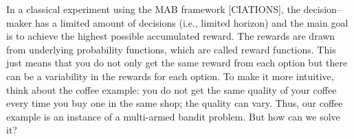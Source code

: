  

In a classical experiment using the MAB framework [CIATIONS], the decision--maker has a limited amount of decisions (i.e., limited horizon) and the main goal is to achieve the highest possible accumulated reward. %
The rewards are drawn from underlying probability functions, which are called reward functions. This just means that you do not only get the same reward from each option but there can be a variability in the rewards for each option. To make it more intuitive, think about the coffee example: you do not get the same quality of your coffee every time you buy one in the same shop; the quality can vary. Thus, our coffee example is an instance of a multi-armed bandit problem. But how can we solve it? 


